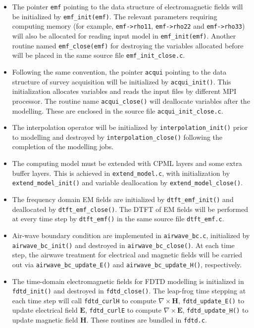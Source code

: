 \documentclass[a4paper,10pt]{article}
\begin{document}
\begin{itemize}

\item The pointer \verb|emf| pointing to the data structure of electromagnetic fields will be initialized by \verb|emf_init(emf)|. The relevant parameters requiring computing memory (for example, \verb|emf->rho11|, \verb|emf->rho22| and \verb|emf->rho33|) will also be allocated for reading input model in \verb|emf_init(emf)|.  Another routine named \verb|emf_close(emf)| for destroying the variables allocated before will be placed in the same source file \verb|emf_init_close.c|. 

\item Following the same convention, the pointer \verb|acqui| pointing to the data structure of survey acquisition will be initialized by \verb|acqui_init()|. This initialization allocates variables and reads the input files by different MPI processor. The routine name \verb|acqui_close()| will deallocate variables after the modelling. These are enclosed in the source file \verb|acqui_init_close.c|.

\item  The interpolation operator will be initialized by \verb|interpolation_init()| prior to modelling and destroyed by \verb|interpolation_close()| following the completion of the modelling jobs.

\item The computing model must be extended with CPML layers and some extra buffer layers. This is achieved in \verb|extend_model.c|, with initialization by \verb|extend_model_init()| and variable deallocation by \verb|extend_model_close()|.

\item The frequency domain EM fields are initialized by \verb|dtft_emf_init()| and deallocated by \verb|dtft_emf_close()|. The DTFT of EM fields will be performed at every time step by \verb|dtft_emf()| in the same source file \verb|dtft_emf.c|.

\item Air-wave boundary condition are implemented in \verb|airwave_bc.c|, initialized by \verb|airwave_bc_init()| and destroyed in \verb|airwave_bc_close()|. At each time step, the airwave treatment for electrical and magnetic fields will be carried out via \verb|airwave_bc_update_E()| and \verb|airwave_bc_update_H()|, respectively.

\item The time-domain electromagnetic fields for FDTD modelling is initialized in \verb|fdtd_init()| and destroyed in \verb|fdtd_close()|. The leap-frog time stepping at each time step will call \verb|fdtd_curlH| to compute $\nabla\times \mathbf{H}$, \verb|fdtd_update_E()| to update electrical field $\mathbf{E}$, \verb|fdtd_curlE| to compute $\nabla\times \mathbf{E}$, \verb|fdtd_update_H()| to update magnetic field $\mathbf{H}$. These routines are bundled in \verb|fdtd.c|.


\end{itemize}
\end{document}
